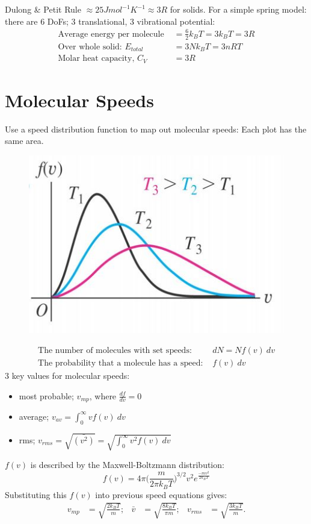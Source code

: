 \documentclass[a4paper, 11pt, normalem]{report}
\begin{document}
Dulong \& Petit Rule $\approx 25 J mol^{-1} K^{-1} \approx 3R$ for solids.
For a simple spring model: there are 6 DoFs; 3 translational, 3 vibrational potential:
\begin{align}
    \text{Average energy per molecule } &= \frac{6}{2}k_{B}T = 3k_{B}T = 3R \\
    \text{Over whole solid: } E_{total} &= 3Nk_{B}T = 3nRT\\
    \text{Molar heat capacity, } C_{V} &= 3R
\end{align}

\section{Molecular Speeds}
Use a speed distribution function to map out molecular speeds:
Each plot has the same area.
\begin{figure}[H]
    \centering
    \includegraphics[scale=0.85]{Distribution.jpg}
\end{figure}
\begin{align}
    \text{The number of molecules with set speeds: }& dN = Nf(v)~dv \\
    \text{The probability that a molecule has a speed: }& f(v)~dv
\end{align}
3 key values for molecular speeds:
\begin{itemize}
	\item most probable; $v_{mp}$, where $\frac{df}{dv} = 0$
	\item average; $v_{av} = \int_{0}^{\infty} vf(v)~dv$
	\item rms; $v_{rms} = \sqrt{\bar{(v^{2})}} = \sqrt{\int_{0}^{\infty} v^{2}f(v)~dv}$
\end{itemize}
$f(v)$ is described by the Maxwell-Boltzmann distribution:
\begin{equation}
	f(v) = 4{\pi}\bigg(\frac{m}{2{\pi}k_{B}T}\bigg)^{3/2}v^{2}e^{\frac{-mv^{2}}{2k_{B}T}}
\end{equation}
Substituting this $f(v)$ into previous speed equations gives:
\begin{align}
    v_{mp} &= \sqrt{\frac{2k_{B}T}{m}}; & \bar{v} &= \sqrt{\frac{8k_{B}T}{{\pi}m}}; & v_{rms} &= \sqrt{\frac{3k_{B}T}{m}}.
\end{align}
\end{document}
